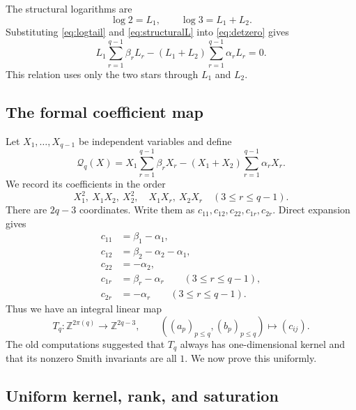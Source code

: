 \documentclass[11pt]{article}
\theoremstyle{definition}
\theoremstyle{remark}
\newcommand{\Z}{\mathbb Z}
\newcommand{\cQ}{\mathcal Q}
\begin{document}
The structural logarithms are
\begin{equation}\label{eq:structuralL}
 \log2=L_1,
 \qquad
 \log3=L_1+L_2.
\end{equation}
Substituting \eqref{eq:logtail} and \eqref{eq:structuralL} into
\eqref{eq:detzero} gives
\begin{equation}\label{eq:stairrelation}
 L_1\sum_{r=1}^{q-1}\beta_rL_r
 -(L_1+L_2)\sum_{r=1}^{q-1}\alpha_rL_r=0.
\end{equation}
This relation uses only the two stars through $L_1$ and $L_2$.

\subsection{The formal coefficient map}

Let $X_1,\ldots,X_{q-1}$ be independent variables and define
\begin{equation}\label{eq:formalQ}
 \cQ_q(X)=X_1\sum_{r=1}^{q-1}\beta_rX_r
 -(X_1+X_2)\sum_{r=1}^{q-1}\alpha_rX_r.
\end{equation}
We record its coefficients in the order
\begin{equation}\label{eq:monomialorder}
 X_1^2,\ X_1X_2,\ X_2^2,
 \quad X_1X_r,\ X_2X_r\quad(3\le r\le q-1).
\end{equation}
There are $2q-3$ coordinates.  Write them as
$c_{11},c_{12},c_{22},c_{1r},c_{2r}$.  Direct expansion gives
\begin{align}
 c_{11}&=\beta_1-\alpha_1,\label{eq:c11}\\
 c_{12}&=\beta_2-\alpha_2-\alpha_1,\label{eq:c12}\\
 c_{22}&=-\alpha_2,\label{eq:c22}\\
 c_{1r}&=\beta_r-\alpha_r\qquad(3\le r\le q-1),\label{eq:c1r}\\
 c_{2r}&=-\alpha_r\qquad(3\le r\le q-1).\label{eq:c2r}
\end{align}
Thus we have an integral linear map
\begin{equation}\label{eq:Tq}
 T_q:\Z^{2\pi(q)}\longrightarrow\Z^{2q-3},
 \qquad
 ((a_p)_{p\le q},(b_p)_{p\le q})\longmapsto(c_{ij}).
\end{equation}
The old computations suggested that $T_q$ always has one-dimensional kernel and
that its nonzero Smith invariants are all $1$.  We now prove this uniformly.

\subsection{Uniform kernel, rank, and saturation}
\end{document}
